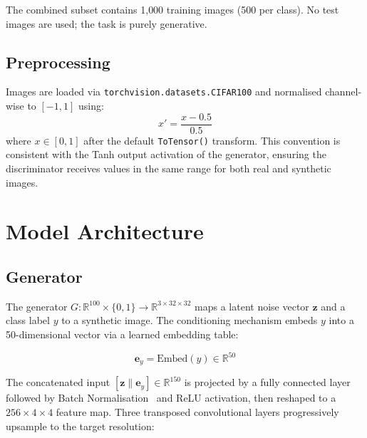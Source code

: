 \documentclass[conference]{IEEEtran}
\begin{document}
The combined subset contains 1{,}000 training images (500 per class). No test images are used; the task is purely generative.

\subsection{Preprocessing}
Images are loaded via \texttt{torchvision.datasets.CIFAR100} and normalised channel-wise to $[-1, 1]$ using:
\begin{equation}
  x' = \frac{x - 0.5}{0.5}
  \label{eq:norm}
\end{equation}
where $x \in [0, 1]$ after the default \texttt{ToTensor()} transform. This convention is consistent with the Tanh output activation of the generator, ensuring the discriminator receives values in the same range for both real and synthetic images.

\section{Model Architecture}
\label{sec:architecture}

\subsection{Generator}
\label{ssec:gen}

The generator $G: \mathbb{R}^{100} \times \{0,1\} \rightarrow \mathbb{R}^{3 \times 32 \times 32}$ maps a latent noise vector $\mathbf{z}$ and a class label $y$ to a synthetic image. The conditioning mechanism embeds $y$ into a 50-dimensional vector via a learned embedding table:

\begin{equation}
  \mathbf{e}_y = \text{Embed}(y) \in \mathbb{R}^{50}
  \label{eq:embed_g}
\end{equation}

The concatenated input $[\mathbf{z} \| \mathbf{e}_y] \in \mathbb{R}^{150}$ is projected by a fully connected layer followed by Batch Normalisation~\cite{ioffe2015} and ReLU activation, then reshaped to a $256 \times 4 \times 4$ feature map. Three transposed convolutional layers progressively upsample to the target resolution:
\end{document}
